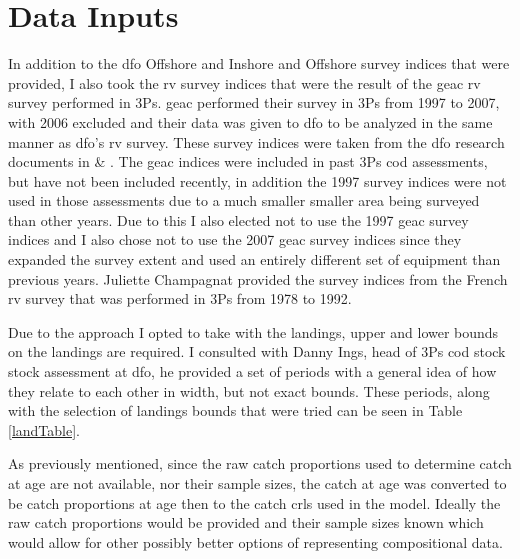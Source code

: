 \documentclass[11pt]{article}\usepackage[]{graphicx}\usepackage[]{color}
\begin{document}
\section{Data Inputs} 
In addition to the \acrshort{dfo} Offshore and Inshore and Offshore survey indices that were provided, I also took the \acrshort{rv} survey indices that were the result of the \acrfull{geac} \acrshort{rv} survey performed in 3Ps. \acrshort{geac} performed their survey in 3Ps from 1997 to 2007, with 2006 excluded and their data was given to \acrshort{dfo} to be analyzed in the same manner as \acrshort{dfo}'s \acrshort{rv} survey. These survey indices were taken from the \acrshort{dfo} research documents in \cite{mcclintock2005year} \& \cite{mcclintock2011fall}. The \acrshort{geac} indices were included in past 3Ps cod assessments, but have not been included recently, in addition the 1997 survey indices were not used in those assessments due to a much smaller smaller area being surveyed than other years\cite{brattey2005assessment}. Due to this I also elected not to use the 1997 \acrshort{geac} survey indices and I also chose not to use the 2007 \acrshort{geac} survey indices since they expanded the survey extent and used an entirely different set of equipment than previous years. Juliette Champagnat provided the survey indices from the French \acrshort{rv} survey that was performed in 3Ps from 1978 to 1992.

Due to the approach I opted to take with the landings, upper and lower bounds on the landings are required. I consulted with Danny Ings, head of 3Ps cod stock stock assessment at \acrshort{dfo}, he provided a set of periods with a general idea of how they relate to each other in width, but not exact bounds. These periods, along with the selection of landings bounds that were tried can be seen in Table \ref{landTable}. 

As previously mentioned, since the raw catch proportions used to determine catch at age are not available, nor their sample sizes, the catch at age was converted to be catch proportions at age then to the catch \acrshort{crl}s used in the model. Ideally the raw catch proportions would be provided and their sample sizes known which would allow for other possibly better options of representing compositional data. 
\end{document}
